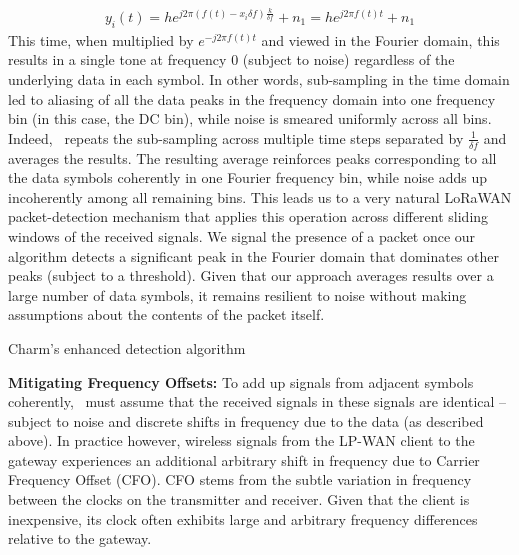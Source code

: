 \begin{align}
    y_i\left(t\right) = h e^{j 2 \pi (f(t) - x_i \delta f) \frac{k}{\delta f}} + n_1 = h e^{j 2 \pi f(t) t} + n_1\label{eqn:yi}
\end{align}
This time, when multiplied by $e^{-j 2 \pi f(t) t}$ and viewed in the Fourier domain, this results in a single tone at frequency $0$ (subject to noise) regardless of the underlying data in each symbol. In other words, sub-sampling in the time domain led to aliasing of all the data peaks in the frequency domain into one frequency bin (in this case, the DC bin), while noise is smeared uniformly across all bins. Indeed, \name\ repeats the sub-sampling across multiple time steps separated  by $\frac{1}{\delta f}$ and averages the results. The resulting average reinforces peaks corresponding to all the data symbols coherently in one Fourier frequency bin, while noise adds up incoherently among all remaining bins. This leads us to a very natural LoRaWAN packet-detection mechanism that applies this operation across different sliding windows of the received signals. We signal the presence of a packet once our algorithm detects a significant peak in the Fourier domain that dominates other peaks (subject to a threshold). Given that our approach averages results over a large number of data symbols, it remains resilient to noise without making assumptions about the contents of the packet itself.  

\LinesNumbered
\begin{algorithm}[ht]
\caption{Charm's enhanced detection algorithm}
\label{alg:algorithm-label2}
\end{algorithm}

\noindent \textbf{Mitigating Frequency Offsets: } To add up signals from adjacent symbols coherently, \name\ must assume that the received signals in these signals are identical -- subject to noise and discrete shifts in frequency due to the data (as described above). In practice however, wireless signals from the LP-WAN client to the gateway experiences an additional arbitrary shift in frequency due to Carrier Frequency Offset (CFO). CFO stems from the subtle variation in frequency between the clocks on the transmitter and receiver. Given that the client is inexpensive, its clock often exhibits large and arbitrary frequency differences relative to the gateway. 

